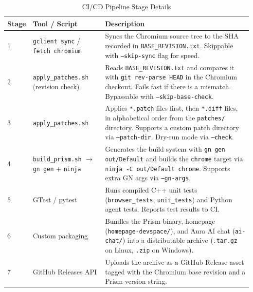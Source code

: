 \begin{longtable}{|p{1.5cm}|p{3.5cm}|p{9cm}|}
\caption{CI/CD Pipeline Stage Details} \\
\hline
\textbf{Stage} & \textbf{Tool / Script} & \textbf{Description} \\ \hline
\endhead
1 & \texttt{gclient sync} / \texttt{fetch chromium} & Syncs the Chromium source tree to the SHA recorded in \texttt{BASE\_REVISION.txt}. Skippable with \texttt{--skip-sync} flag for speed. \\ \hline
2 & \texttt{apply\_patches.sh} (revision check) & Reads \texttt{BASE\_REVISION.txt} and compares it with \texttt{git rev-parse HEAD} in the Chromium checkout. Fails fast if there is a mismatch. Bypassable with \texttt{--skip-base-check}. \\ \hline
3 & \texttt{apply\_patches.sh} & Applies \texttt{*.patch} files first, then \texttt{*.diff} files, in alphabetical order from the \texttt{patches/} directory. Supports a custom patch directory via \texttt{--patch-dir}. Dry-run mode via \texttt{--check}. \\ \hline
4 & \texttt{build\_prism.sh} $\rightarrow$ \texttt{gn gen} + \texttt{ninja} & Generates the build system with \texttt{gn gen out/Default} and builds the \texttt{chrome} target via \texttt{ninja -C out/Default chrome}. Supports extra GN args via \texttt{--gn-args}. \\ \hline
5 & GTest / pytest & Runs compiled C++ unit tests (\texttt{browser\_tests}, \texttt{unit\_tests}) and Python agent tests. Reports test results to CI. \\ \hline
6 & Custom packaging & Bundles the Prism binary, homepage (\texttt{homepage-devspace/}), and Aura AI chat (\texttt{ai-chat/}) into a distributable archive (\texttt{.tar.gz} on Linux, \texttt{.zip} on Windows). \\ \hline
7 & GitHub Releases API & Uploads the archive as a GitHub Release asset tagged with the Chromium base revision and a Prism version string. \\ \hline
\end{longtable}

